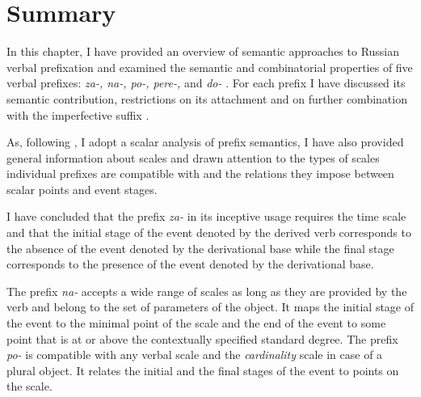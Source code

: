 
\section{Summary}
In this chapter, I have provided an overview of semantic approaches to Russian verbal prefixation  and examined the semantic and combinatorial properties of five verbal prefixes: \textit{za-, na-, po-, pere-,} and \textit{do-}  . For each prefix I have discussed its semantic contribution, restrictions on its attachment and on further combination with the imperfective suffix  . 

As, following \citet{Kagan:book}, I adopt a scalar analysis of prefix semantics, I have also provided general information about scales and drawn attention to the types of scales individual prefixes are compatible with and the relations they impose between scalar points and event stages. 

I have concluded that the prefix \textit{za-}   in its inceptive  usage requires the time scale and that the initial stage of the event denoted by the derived verb corresponds to the absence of the event denoted by the derivational base while the final stage corresponds to the presence of the event denoted by the derivational base. 

The prefix \textit{na-}   accepts a wide range of scales as long as they are provided by the verb and belong to the set of parameters of the object. It maps the initial stage of the event to the minimal point of the scale and the end of the event to some point that is at or above the contextually specified standard degree. The prefix \textit{po-}   is compatible with any verbal scale and the \textit{cardinality} scale in case of a plural object. It relates the initial and the final stages of the event to points on the scale. 

